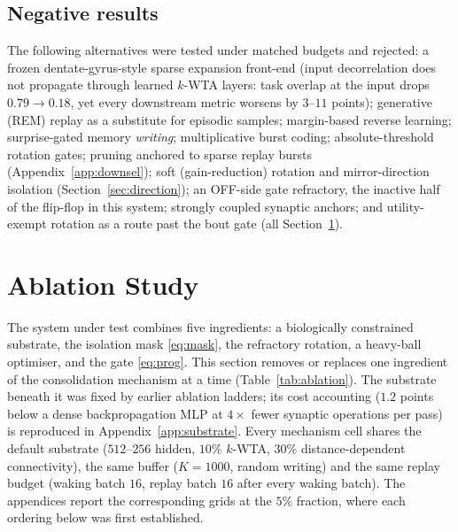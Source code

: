 \documentclass{article}
\newcommand{\kwta}{$k$-WTA}
\begin{document}
\subsection{Negative results}
The following alternatives were tested under matched budgets and rejected: a frozen
dentate-gyrus-style sparse expansion front-end (input decorrelation does not propagate
through learned \kwta{} layers: task overlap at the input drops $0.79\to0.18$, yet every
downstream metric worsens by $3$--$11$ points); generative (REM) replay as a substitute for
episodic samples; margin-based reverse learning; surprise-gated memory \emph{writing};
multiplicative burst coding; absolute-threshold rotation gates; pruning anchored to sparse
replay bursts (Appendix~\ref{app:downsel}); soft (gain-reduction) rotation and
mirror-direction isolation (Section~\ref{sec:direction}); an OFF-side gate refractory, the
inactive half of the flip-flop in this system; strongly coupled synaptic anchors; and
utility-exempt rotation as a route past the bout gate (all Section~\ref{sec:ablation}).

\section{Ablation Study}
\label{sec:ablation}

The system under test combines five ingredients: a biologically constrained substrate, the
isolation mask \eqref{eq:mask}, the refractory rotation, a heavy-ball optimiser, and the
gate \eqref{eq:prog}. This section removes or replaces one ingredient of the consolidation
mechanism at a time (Table~\ref{tab:ablation}). The substrate beneath it was fixed by earlier
ablation ladders; its cost accounting ($1.2$ points below a dense backpropagation MLP at
$4\times$ fewer synaptic operations per pass) is reproduced in Appendix~\ref{app:substrate}.
Every mechanism cell shares the default substrate ($512$--$256$ hidden, $10\%$ \kwta{},
$30\%$ distance-dependent connectivity), the same buffer ($K{=}1000$, random writing) and the
same replay budget (waking batch $16$, replay batch $16$ after every waking batch). The
appendices report the corresponding grids at the $5\%$ fraction, where each ordering below
was first established.
\end{document}
